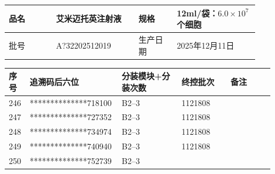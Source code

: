\documentclass[UTF8,10pt,a4paper,fontset=fandol]{ctexart}
\newcommand{\fieldvalue}[1]{#1}
\begin{document}
\begin{center}
\small
\begin{tabular}{|p{0.16\linewidth}|p{0.28\linewidth}|p{0.13\linewidth}|p{0.28\linewidth}|}
\hline
品名 &
\fieldvalue{艾米迈托英注射液} &
规格 &
\fieldvalue{12ml/袋：$6.0\times 10^{7}$个细胞}
\\ \hline
批号 &
\fieldvalue{A?32202512019} &
生产日期 &
\fieldvalue{2025年12月11日}
\\ \hline
\end{tabular}

\vspace{2pt}

\scriptsize
\begin{tabular}{|p{0.07\linewidth}|p{0.27\linewidth}|p{0.22\linewidth}|p{0.18\linewidth}|p{0.16\linewidth}|}
\hline
序号 & 追溯码后六位 & 分装模块+分装次数 & 终控批次 & 备注 \\ \hline
246 &
\fieldvalue{**************718100} &
\fieldvalue{B2--3} &
\fieldvalue{1121808} & \\ \hline
247 &
\fieldvalue{**************727352} &
\fieldvalue{B2--3} &
\fieldvalue{1121808} & \\ \hline
248 &
\fieldvalue{**************734974} &
\fieldvalue{B2--3} &
\fieldvalue{1121808} & \\ \hline
249 &
\fieldvalue{**************740940} &
\fieldvalue{B2--3} &
\fieldvalue{1121808} & \\ \hline
250 &
\fieldvalue{**************752739} &
\fieldvalue{B2--3} &

\end{tabular}
\end{center}
\end{document}
